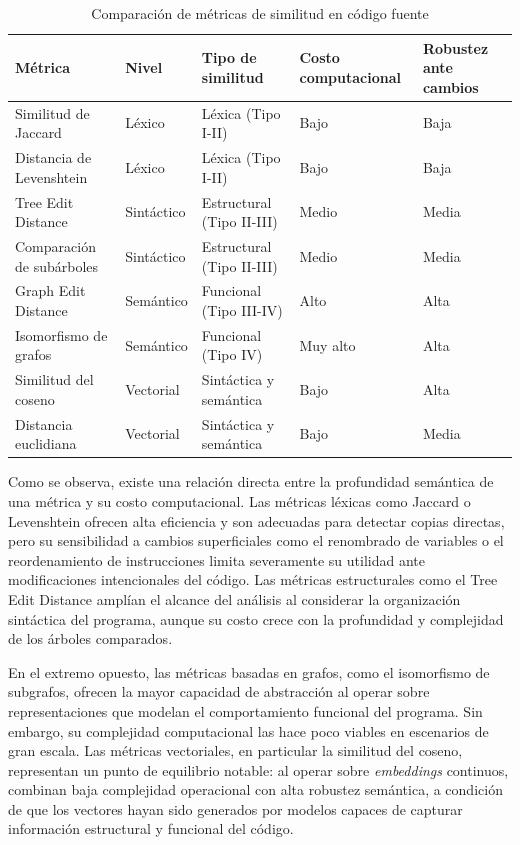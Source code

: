 \begin{table}[htbp]
\centering
\caption{Comparación de métricas de similitud en código fuente}
\label{tab:comparacion_metricas}
\small
\begin{tabularx}{\textwidth}{lXXXX}
\hline
\textbf{Métrica} & \textbf{Nivel} & \textbf{Tipo de similitud} 
& \textbf{Costo computacional} & \textbf{Robustez ante cambios} \\
\hline
Similitud de Jaccard   & Léxico     & Léxica (Tipo I-II)      & Bajo  & Baja \\
Distancia de Levenshtein & Léxico   & Léxica (Tipo I-II)      & Bajo  & Baja \\
Tree Edit Distance     & Sintáctico & Estructural (Tipo II-III) & Medio & Media \\
Comparación de subárboles & Sintáctico & Estructural (Tipo II-III) & Medio & Media \\
Graph Edit Distance    & Semántico  & Funcional (Tipo III-IV)  & Alto  & Alta \\
Isomorfismo de grafos  & Semántico  & Funcional (Tipo IV)      & Muy alto & Alta \\
Similitud del coseno   & Vectorial  & Sintáctica y semántica   & Bajo  & Alta \\
Distancia euclidiana   & Vectorial  & Sintáctica y semántica   & Bajo  & Media \\
\hline
\end{tabularx}
\end{table}

Como se observa, existe una relación directa entre la profundidad semántica de una 
métrica y su costo computacional. Las métricas léxicas como Jaccard o Levenshtein 
ofrecen alta eficiencia y son adecuadas para detectar copias directas, pero su 
sensibilidad a cambios superficiales como el renombrado de variables o el 
reordenamiento de instrucciones limita severamente su utilidad ante modificaciones 
intencionales del código. Las métricas estructurales como el Tree Edit Distance 
amplían el alcance del análisis al considerar la organización sintáctica del 
programa, aunque su costo crece con la profundidad y complejidad de los árboles 
comparados.

En el extremo opuesto, las métricas basadas en grafos, como el isomorfismo de 
subgrafos, ofrecen la mayor capacidad de abstracción al operar sobre representaciones 
que modelan el comportamiento funcional del programa. Sin embargo, su complejidad 
computacional las hace poco viables en escenarios de gran escala. Las métricas 
vectoriales, en particular la similitud del coseno, representan un punto de 
equilibrio notable: al operar sobre \textit{embeddings} continuos, combinan baja 
complejidad operacional con alta robustez semántica, a condición de que los vectores 
hayan sido generados por modelos capaces de capturar información estructural y 
funcional del código.

